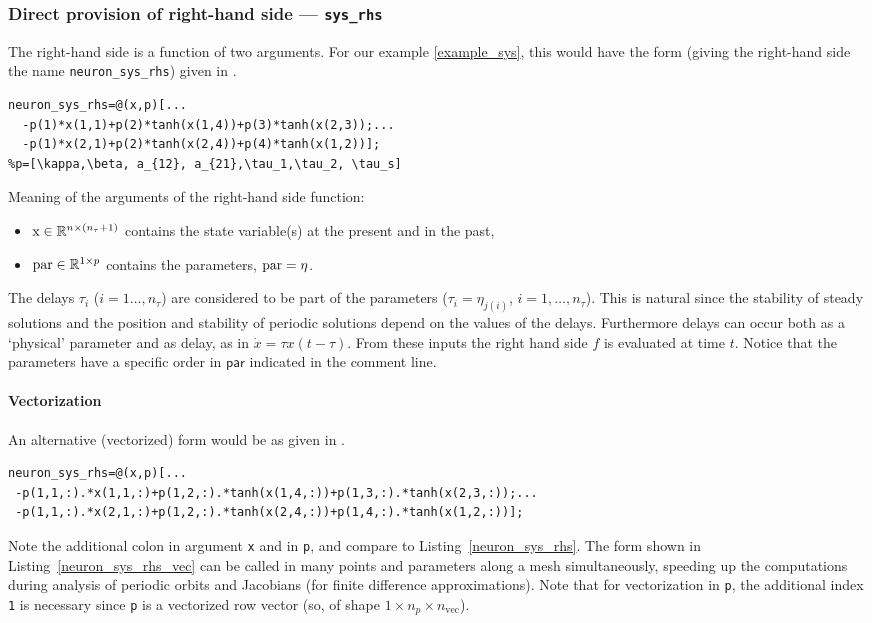 \documentclass[10pt]{scrartcl}
\newcommand{\parm}[1]{\mathsf{#1}}
\newcommand{\RR}{\mathbb{R}}
\newcommand{\blist}[1]{\mbox{\lstinline!#1!}}
\begin{document}
\subsubsection{Direct provision of right-hand side --- \texorpdfstring{\blist{sys_rhs}}{sys\_rhs}}\label{sec:constrhs} 
The right-hand side is a function of two arguments. For our example
\eqref{example_sys}, this would have the form (giving the right-hand
side the name \blist{neuron_sys_rhs}) given in .
\begin{lstlisting}[float,frame=lines,label=neuron_sys_rhs,caption={Definition for right-hand side of \eqref{example_sys} as a variable. See \Cref{neuron_sys_rhs_vec} for the vectorized version.}]
neuron_sys_rhs=@(x,p)[...
  -p(1)*x(1,1)+p(2)*tanh(x(1,4))+p(3)*tanh(x(2,3));...
  -p(1)*x(2,1)+p(2)*tanh(x(2,4))+p(4)*tanh(x(1,2))];  
%p=[\kappa,\beta, a_{12}, a_{21},\tau_1,\tau_2, \tau_s]
\end{lstlisting}
Meaning of the arguments of the right-hand side function:
\begin{itemize}
\item $\blist{x}\in\RR^{n\times (n_\tau+1)}$ contains the state
variable(s) at the present and in the past,
\item $\blist{par}\in\RR^{1\times
  p}$ contains the parameters, $\blist{par}=\eta$.
\end{itemize}
The delays $\tau_i$ ($i=1\ldots,n_\tau$) are considered to be part of the
parameters ($\tau_i=\eta_{j(i)}$, $i=1,\ldots,n_\tau$).  This is natural
since the stability of steady solutions and the position and stability
of periodic solutions depend on the values of the delays.  Furthermore
delays can occur both as a `physical' parameter and as delay, as in
$\dot{x}=\tau x(t-\tau)$.  From these inputs the right hand side $f$
is evaluated at time $t$. Notice that the parameters have a specific
order in $\parm{par}$ indicated in the comment line.

\paragraph{Vectorization}
An alternative (vectorized) form would be as given in
.
\begin{lstlisting}[float,frame=lines,label=neuron_sys_rhs_vec,caption={Alternative definition of the right-hand side of \eqref{example_sys}, vectorized in \blist{x} and \blist{p} for speed-up of periodic orbit and bifurcation computations.}]
neuron_sys_rhs=@(x,p)[...
 -p(1,1,:).*x(1,1,:)+p(1,2,:).*tanh(x(1,4,:))+p(1,3,:).*tanh(x(2,3,:));...
 -p(1,1,:).*x(2,1,:)+p(1,2,:).*tanh(x(2,4,:))+p(1,4,:).*tanh(x(1,2,:))];
\end{lstlisting}
Note the additional colon in argument \blist{x} and in \blist{p}, and compare to
Listing~\ref{neuron_sys_rhs}. The form shown in
Listing~\ref{neuron_sys_rhs_vec} can be called in many points and parameters along a
mesh simultaneously, speeding up the computations during analysis of
periodic orbits and Jacobians (for finite difference approximations). Note that for vectorization in \blist{p}, the additional index \blist{1} is necessary since \blist{p} is a vectorized row vector (so, of shape $1\times n_p\times n_\mathrm{vec}$).
\end{document}

